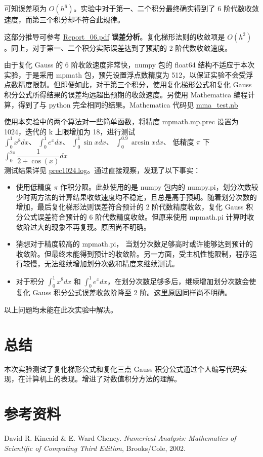 \documentclass{ctexart}
\begin{document}
	可知误差项为 $O(h^6)$。实验中对于第一、二个积分最终确实得到了 6 阶代数收敛速度，而第三个积分却不符合此规律。\\
	
	
	这部分推导可参考 \href{Report_06.pdf}{Report\_06.pdf} {\bf 误差分析}。复化梯形法则的收敛项是 $O(h^2)$。同上，对于第一、二个积分实际误差达到了预期的 2 阶代数收敛速度。\\
	
	
	由于复化 Gauss 的 6 阶收敛速度非常快，numpy 包的 float64 结构不适应于本次实验，于是采用 mpmath 包，预先设置浮点数精度为 512，以保证实验不会受浮点数精度限制。但即便如此，对于第三个积分，使用复化梯形公式和复化 Gauss 积分公式所得结果的误差均远超出预期的收敛速度。另使用 Mathematica 编程计算，得到了与 python 完全相同的结果。Mathematica 代码见 \href{mma_test.nb}{mma\_test.nb}
	
	使用本实验中的两个算法对一些简单函数，将精度 mpmath.mp.prec 设置为 1024，迭代的 k 上限增加为 18，进行测试\\
	
	$\displaystyle \int_0^1 x^8 dx$、
	$\displaystyle \int_0^1 e^x dx$、
	$\displaystyle \int_0^1 \sin x dx$、
	$\displaystyle \int_0^{0.9} \arcsin x dx$、
	低精度 $\pi$ 下 $\displaystyle \int_0^{2\pi} \dfrac{1}{2 + \cos(x)} dx$ \\
	
	测试结果详见 \href{prec1024.log}{prec1024.log}。通过直接观察，发现了以下事实：
	\begin{itemize}
		\item 使用低精度 $\pi$ 作积分限。此处使用的是 numpy 包内的 numpy.pi，划分次数较少时两方法的计算结果收敛速度均不稳定，且总是高于预期。随着划分次数的增加，最后复化梯形法则误差符合预计的 2 阶代数精度收敛，复化 Gauss 积分公式误差符合预计的 6 阶代数精度收敛。但原来使用 mpmath.pi 计算时收敛阶过大的现象不再复现。原因尚不明确。\\
		
		\item 猜想对于精度较高的 mpmath.pi， 当划分次数足够高时或许能够达到预计的收敛阶。但最终未能得到预计的收敛阶。另一方面，受主机性能限制，程序运行较慢，无法继续增加划分次数和精度来继续测试。\\
		
		\item 对于积分 $\displaystyle \int_0^1 x^8 dx$ 和 $\displaystyle \int_0^1 e^x dx$，在划分次数足够多后，继续增加划分次数会使复化 Gauss 积分公式误差收敛阶降至 2 阶。这里原因同样尚不明确。
	\end{itemize}
	
	以上问题均未能在此次实验中解决。
	
\section*{总结}
	本次实验测试了复化梯形公式和复化三点 Gauss 积分公式通过个人编写代码实现，在计算机上的表现。增进了对数值积分方法的理解。
	
\section*{参考资料}
	\noindent [1] David R. Kincaid \& E. Ward Cheney. {\it Numerical Analysis: Mathematics of Scientific of Computing Third Edition}, Brooks/Cole, 2002.
\end{document}
